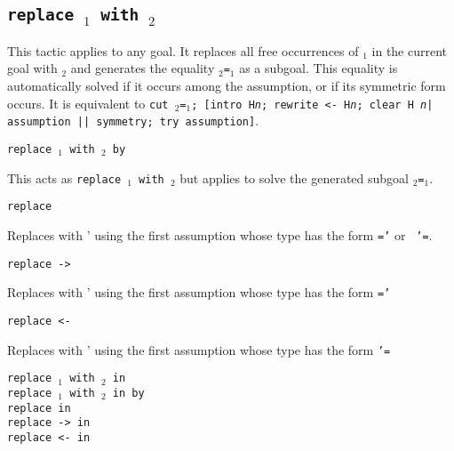 \begin{coq_example*}
\begin{Variants}
\end{Variants}

\subsection{\tt replace \term$_1$ with \term$_2$}
\label{tactic:replace}

This tactic applies to any goal. It replaces all free occurrences of
{\term$_1$} in the current goal with {\term$_2$} and generates the
equality {\term$_2$}{\tt =}{\term$_1$} as a subgoal. This equality is
automatically solved if it occurs among the assumption, or if its
symmetric form occurs.  It is equivalent to {\tt cut
\term$_2$=\term$_1$; [intro H{\sl n}; rewrite <- H{\sl n}; clear H{\sl
n}| assumption || symmetry; try assumption]}.

\begin{ErrMsgs}
\item {}
\end{ErrMsgs}

\begin{Variants}

\item {\tt replace \term$_1$ with \term$_2$ by \tac}

  This acts as {\tt replace \term$_1$ with \term$_2$} but applies {\tt \tac}
  to solve the generated subgoal {\tt \term$_2$=\term$_1$}.

\item {\tt replace {\term}}

  Replaces {\term} with {\term'} using the
  first assumption whose type has the form {\tt \term=\term'} or {\tt
    \term'=\term}.

\item {\tt replace -> {\term}}

  Replaces {\term} with {\term'} using the
  first assumption whose type has the form {\tt \term=\term'}

\item {\tt replace <- {\term}}

  Replaces {\term} with {\term'} using the
  first assumption whose type has the form {\tt \term'=\term}

\item {\tt replace {\term$_1$} with {\term$_2$} in  }\\
    {\tt replace {\term$_1$} with {\term$_2$} in  by \tac }\\
    {\tt replace {\term} in }\\
    {\tt replace -> {\term} in }\\
    {\tt replace <- {\term} in }


\end{Variants}
\end{coq_example*}
